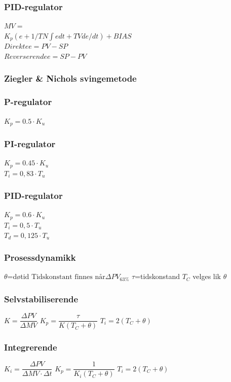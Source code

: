 \documentclass[10pt,a5paper]{article}
\begin{document}
\subsubsection*{PID-regulator}
$MV=$\\
$K_p(e+1/TN \int e dt + TV de/dt)+BIAS$\\
\vskip 2.5pt
$Direkte e=PV-SP$\\
$Reverserende e=SP-PV$\\
\subsubsection*{Ziegler \& Nichols svingemetode}
\subsubsection*{P-regulator}
$K_p = 0.5\cdot K_u$
\subsubsection*{PI-regulator}
$K_p = 0.45\cdot K_u$\\
$T_i = 0,83\cdot T_u$\\
\subsubsection*{PID-regulator}
$K_p = 0.6\cdot K_u$\\
$T_i = 0,5\cdot T_u$\\
$T_d = 0,125\cdot T_u$\\
\vskip 2.5pt 
\subsubsection*{Prosessdynamikk}
\vskip 2.5pt 
$\theta$=døtid
\vskip 2.5pt 
$ \text{Tidskonstant finnes når} \Delta PV_{63\%}$
\vskip 2.5pt 
$\tau$=tidskonstand
\vskip 2.5pt 
$T_C$ velges lik $\theta$
\vskip 2.5pt 
\subsubsection*{Selvstabiliserende}
\vskip 2.5pt 
$K=\dfrac{\Delta PV}{\Delta MV} $
\vskip 2.5pt 
$K_p=\dfrac{\tau}{K(T_C+\theta)}$
\vskip 2.5pt 
$T_i=2(T_C+\theta)$
\vskip 2.5pt 
\subsubsection*{Integrerende}
\vskip 2.5pt 
$K_i=\dfrac{\Delta PV}{\Delta MV \cdot {\Delta t}}$
\vskip 2.5pt 
$K_p=\dfrac{1}{K_i(T_C+\theta)}$
\vskip 2.5pt 
$T_i=2(T_C+\theta)$\\
\end{document}
